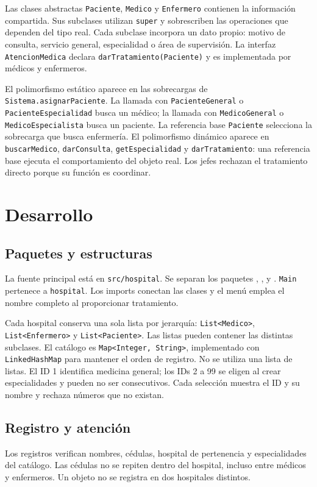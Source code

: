 \documentclass[letterpaper,12pt,oneside]{article}
\begin{document}
Las clases abstractas \texttt{Paciente}, \texttt{Medico} y \texttt{Enfermero} contienen la información compartida. Sus subclases utilizan \texttt{super} y sobrescriben las operaciones que dependen del tipo real. Cada subclase incorpora un dato propio: motivo de consulta, servicio general, especialidad o área de supervisión. La interfaz \texttt{AtencionMedica} declara \texttt{darTratamiento(Paciente)} y es implementada por médicos y enfermeros.

El polimorfismo estático aparece en las sobrecargas de \texttt{Sistema.asignarPaciente}. La llamada con \texttt{PacienteGeneral} o \texttt{PacienteEspecialidad} busca un médico; la llamada con \texttt{MedicoGeneral} o \texttt{MedicoEspecialista} busca un paciente. La referencia base \texttt{Paciente} selecciona la sobrecarga que busca enfermería. El polimorfismo dinámico aparece en \texttt{buscarMedico}, \texttt{darConsulta}, \texttt{getEspecialidad} y \texttt{darTratamiento}: una referencia base ejecuta el comportamiento del objeto real. Los jefes rechazan el tratamiento directo porque su función es coordinar.

\section{Desarrollo}
\subsection{Paquetes y estructuras}
La fuente principal está en \texttt{src/hospital}. Se separan los paquetes , ,  y . \texttt{Main} pertenece a \texttt{hospital}. Los imports conectan las clases y el menú emplea el nombre completo  al proporcionar tratamiento.

Cada hospital conserva una sola lista por jerarquía: \texttt{List<Medico>}, \texttt{List<Enfermero>} y \texttt{List<Paciente>}. Las listas pueden contener las distintas subclases. El catálogo es \texttt{Map<Integer, String>}, implementado con \texttt{LinkedHashMap} para mantener el orden de registro. No se utiliza una lista de listas. El ID 1 identifica medicina general; los IDs 2 a 99 se eligen al crear especialidades y pueden no ser consecutivos. Cada selección muestra el ID y su nombre y rechaza números que no existan.

\subsection{Registro y atención}
Los registros verifican nombres, cédulas, hospital de pertenencia y especialidades del catálogo. Las cédulas no se repiten dentro del hospital, incluso entre médicos y enfermeros. Un objeto no se registra en dos hospitales distintos.
\end{document}
